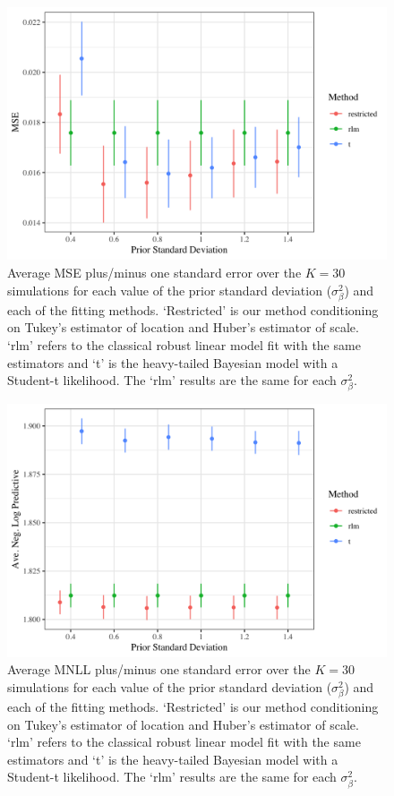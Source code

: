 \documentclass[ba]{imsart}
\begin{document}
\begin{figure}[t]
\centering
\includegraphics[width = 5in]{mse_sim_many_p.png}
\caption{Average MSE plus/minus one standard error over the $K = 30$ simulations for each value of the prior standard deviation ($\sigma^{2}_{\beta}$) and each of the fitting methods. `Restricted' is our method conditioning on Tukey's estimator of location and Huber's estimator of scale. `rlm' refers to the classical robust linear model fit with the same estimators and `t' is the heavy-tailed Bayesian model with a Student-t likelihood. The `rlm' results are the same for each $\sigma^{2}_{\beta}$.}
\label{mseSimMany}
\end{figure}

\begin{figure}[t]
\centering
\includegraphics[width = 5in]{negll_sim_many_p.png}
\caption{Average MNLL plus/minus one standard error over the $K = 30$ simulations for each value of the prior standard deviation ($\sigma^{2}_{\beta}$) and each of the fitting methods. `Restricted' is our method conditioning on Tukey's estimator of location and Huber's estimator of scale. `rlm' refers to the classical robust linear model fit with the same estimators and `t' is the heavy-tailed Bayesian model with a Student-t likelihood. The `rlm' results are the same for each $\sigma^{2}_{\beta}$.}
\label{negllSimMany}
\end{figure}
\end{document}
